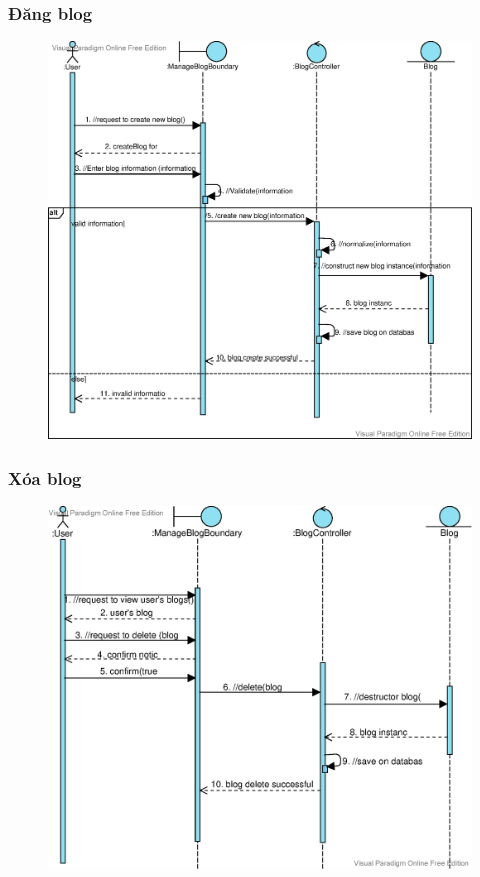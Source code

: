 \documentclass[./../main_file.tex]{subfiles}
\begin{document}
	\subsubsection{Đăng blog}
	\begin{figure}[H]
		\centering
		\includegraphics[width=\linewidth]{./images/sequence_diagram/3_3_3_CreateBlog.eps}
	\end{figure}
	\subsubsection{Xóa blog}
	\begin{figure}[H]
		\centering
		\includegraphics[width=.9\linewidth]{./images/sequence_diagram/3_3_4_BlogDelete.eps}
	\end{figure}
\end{document}
